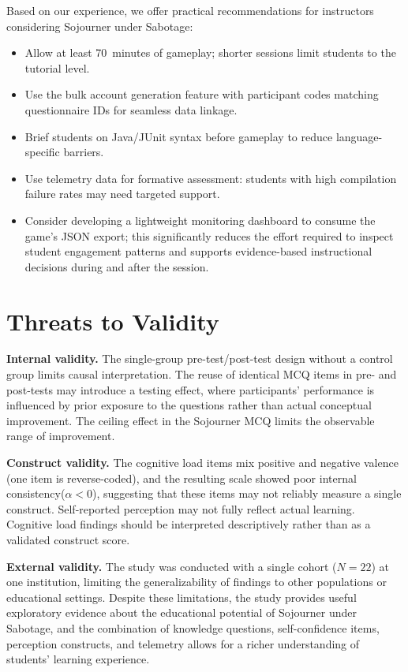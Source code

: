 \documentclass[conference]{IEEEtran}
\begin{document}
Based on our experience, we offer practical recommendations for instructors considering Sojourner under Sabotage:
\begin{itemize}
    \item Allow at least 70~minutes of gameplay; shorter sessions limit students to the tutorial level.
    \item Use the bulk account generation feature with participant codes matching questionnaire IDs for seamless data linkage.
    \item Brief students on Java/JUnit syntax before gameplay to reduce language-specific barriers.
    \item Use telemetry data for formative assessment: students with high compilation failure rates may need targeted support.
    \item Consider developing a lightweight monitoring dashboard to consume the game's JSON export; this significantly reduces the effort required to inspect student engagement patterns and supports evidence-based instructional decisions during and after the session.
\end{itemize}

\section{Threats to Validity}
\label{sec:threats}

\textbf{Internal validity.}
The single-group pre-test/post-test design without a control group limits causal interpretation.
The reuse of identical MCQ items in pre- and post-tests may introduce a testing effect, where participants' performance is influenced by prior exposure to the questions rather than actual conceptual improvement.
The ceiling effect in the Sojourner MCQ limits the observable range of improvement.

\textbf{Construct validity.}
The cognitive load items mix positive and negative valence (one item is reverse-coded), and the resulting scale showed poor internal consistency($\alpha<0$), suggesting that these items may not reliably measure a single construct.
Self-reported perception may not fully reflect actual learning. Cognitive load findings should be interpreted descriptively rather than as a validated construct score.


\textbf{External validity.}
The study was conducted with a single cohort ($N = 22$) at one institution, limiting the generalizability of findings to other populations or educational settings.
Despite these limitations, the study provides useful exploratory evidence about the educational potential of Sojourner under Sabotage, and the combination of knowledge questions, self-confidence items, perception constructs, and telemetry allows for a richer understanding of students' learning experience.
\end{document}
